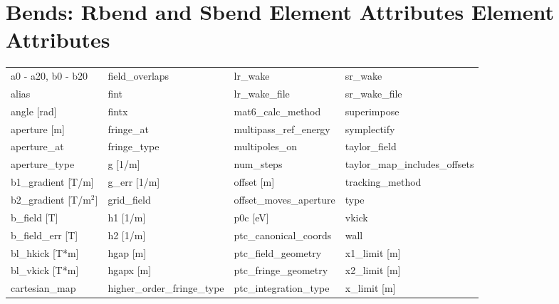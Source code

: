  \vfill
 
 \section{Bends: Rbend and Sbend Element Attributes Element Attributes}
 \label{s:list.bend}
 
 \begin{tabular}{llll} \toprule
a0 - a20, b0 - b20             & field_overlaps                 & lr_wake                        & sr_wake                        \\
alias                          & fint                           & lr_wake_file                   & sr_wake_file                   \\
angle [rad]                    & fintx                          & mat6_calc_method               & superimpose                    \\
aperture [m]                   & fringe_at                      & multipass_ref_energy           & symplectify                    \\
aperture_at                    & fringe_type                    & multipoles_on                  & taylor_field                   \\
aperture_type                  & g [1/m]                        & num_steps                      & taylor_map_includes_offsets    \\
b1_gradient [T/m]              & g_err [1/m]                    & offset [m]                     & tracking_method                \\
b2_gradient [T/m$^2$]          & grid_field                     & offset_moves_aperture          & type                           \\
b_field [T]                    & h1 [1/m]                       & p0c [eV]                       & vkick                          \\
b_field_err [T]                & h2 [1/m]                       & ptc_canonical_coords           & wall                           \\
bl_hkick [T*m]                 & hgap [m]                       & ptc_field_geometry             & x1_limit [m]                   \\
bl_vkick [T*m]                 & hgapx [m]                      & ptc_fringe_geometry            & x2_limit [m]                   \\
cartesian_map                  & higher_order_fringe_type       & ptc_integration_type           & x_limit [m]                    \\

\end{tabular}
